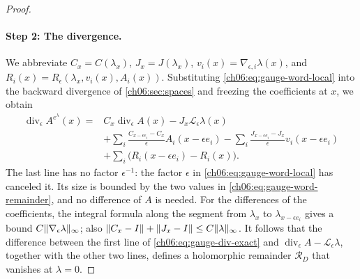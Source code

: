 \begin{proof}
\paragraph{Step 2: The divergence.}
We abbreviate $C_x=C(\lambda_x)$, $J_x=J(\lambda_x)$, $v_i(x)=\nabla_{\epsilon,i}\lambda(x)$, and $R_i(x)=R_\epsilon(\lambda_x,v_i(x),A_i(x))$. Substituting \eqref{ch06:eq:gauge-word-local} into the backward divergence of \cref{ch06:sec:spaces} and freezing the coefficients at $x$, we obtain
\begin{equation}\label{ch06:eq:gauge-div-exact}
 \begin{split}
 \operatorname{div}_\epsilon A^{e^\lambda}(x)={}&C_x\operatorname{div}_\epsilon A(x)-J_x\mathscr L_\epsilon\lambda(x)\\
 &+\sum_i\frac{C_{x-\epsilon e_i}-C_x}\epsilon A_i(x-\epsilon e_i)-\sum_i\frac{J_{x-\epsilon e_i}-J_x}\epsilon v_i(x-\epsilon e_i)\\
 &+\sum_i\bigl(R_i(x-\epsilon e_i)-R_i(x)\bigr).
 \end{split}
\end{equation}
The last line has no factor $\epsilon^{-1}$: the factor $\epsilon$ in \eqref{ch06:eq:gauge-word-local} has canceled it. Its size is bounded by the two values in \eqref{ch06:eq:gauge-word-remainder}, and no difference of $A$ is needed. For the differences of the coefficients, the integral formula along the segment from $\lambda_x$ to $\lambda_{x-\epsilon e_i}$ gives a bound $C\lVert \nabla_\epsilon\lambda\rVert_\infty$; also $\lVert C_x-I\rVert+\lVert J_x-I\rVert\le C\lVert \lambda\rVert_\infty$. It follows that the difference between the first line of \eqref{ch06:eq:gauge-div-exact} and $\operatorname{div}_\epsilon A-\mathscr L_\epsilon\lambda$, together with the other two lines, defines a holomorphic remainder $\mathscr R_D$ that vanishes at $\lambda=0$.


\end{proof}
